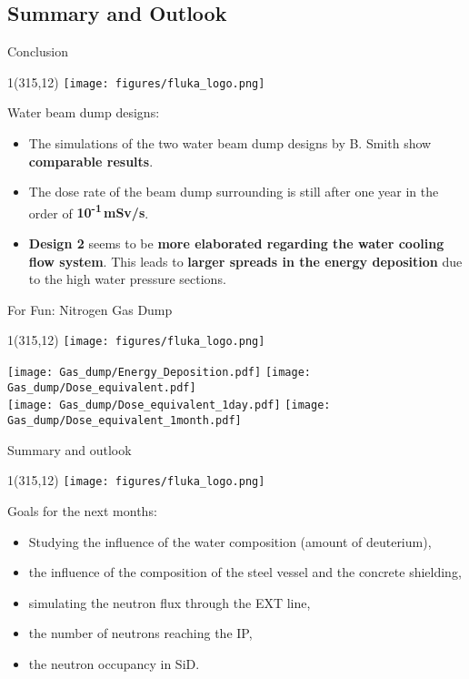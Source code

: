 \documentclass[xcolor={dvipsnames}]{beamer}
\newcommand{\flukalogo}{
  \setlength{\TPHorizModule}{1pt}
  \setlength{\TPVertModule}{1pt}
  \begin{textblock}{1}(315,12)
   \texttt{[image: figures/fluka\_logo.png]}
  \end{textblock}
}
\begin{document}
\subsection{Summary and Outlook}
\begin{frame}{Conclusion}
 \flukalogo
 Water beam dump designs:
 \begin{itemize}
  \item The simulations of the two water beam dump designs by B. Smith show \textbf{comparable results}.
  \item The dose rate of the beam dump surrounding is still after one year in the order of \textbf{10\textsuperscript{-1}\,mSv/s}.
  \item \textbf{Design 2} seems to be \textbf{more elaborated regarding the water cooling flow system}.
  This leads to \textbf{larger spreads in the energy deposition} due to the high water pressure sections.
 \end{itemize}
\end{frame}
\begin{frame}{For Fun: Nitrogen Gas Dump}
 \flukalogo
 \texttt{[image: Gas\_dump/Energy\_Deposition.pdf]}\hfill
 \texttt{[image: Gas\_dump/Dose\_equivalent.pdf]}\\
 \texttt{[image: Gas\_dump/Dose\_equivalent\_1day.pdf]}\hfill
 \texttt{[image: Gas\_dump/Dose\_equivalent\_1month.pdf]}
\end{frame}

\begin{frame}{Summary and outlook}
 \flukalogo
 Goals for the next months:
\begin{itemize}
 \item Studying the influence of the water composition (amount of deuterium),
 \item the influence of the composition of the steel vessel and the concrete shielding,
 \item simulating the neutron flux through the EXT line,
 \item the number of neutrons reaching the IP,
 \item the neutron occupancy in SiD.
\end{itemize}
\end{frame}
\end{document}
